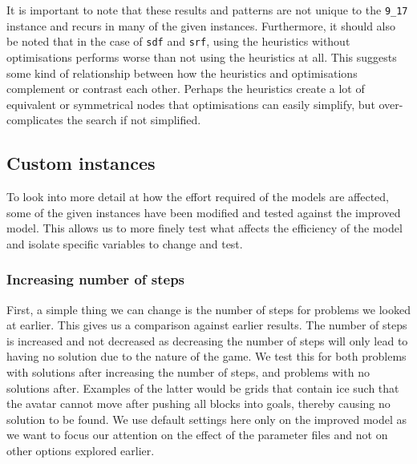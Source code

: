 \documentclass{article}
\begin{document}
\noindent
It is important to note that these results and patterns are not unique to the \texttt{9\_17} instance and recurs in many of the given instances. Furthermore, it should also be noted that in the case of \texttt{sdf} and \texttt{srf}, using the heuristics without optimisations performs worse than not using the heuristics at all. This suggests some kind of relationship between how the heuristics and optimisations complement or contrast each other. Perhaps the heuristics create a lot of equivalent or symmetrical nodes that optimisations can easily simplify, but over-complicates the search if not simplified.

\subsection{Custom instances}
To look into more detail at how the effort required of the models are affected, some of the given instances have been modified and tested against the improved model. This allows us to more finely test what affects the efficiency of the model and isolate specific variables to change and test.


\subsubsection{Increasing number of steps}
First, a simple thing we can change is the number of steps for problems we looked at earlier. This gives us a comparison against earlier results. The number of steps is increased and not decreased as decreasing the number of steps will only lead to having no solution due to the nature of the game. We test this for both problems with solutions after increasing the number of steps, and problems with no solutions after. Examples of the latter would be grids that contain ice such that the avatar cannot move after pushing all blocks into goals, thereby causing no solution to be found. We use default settings here only on the improved model as we want to focus our attention on the effect of the parameter files and not on other options explored earlier. 
\end{document}
